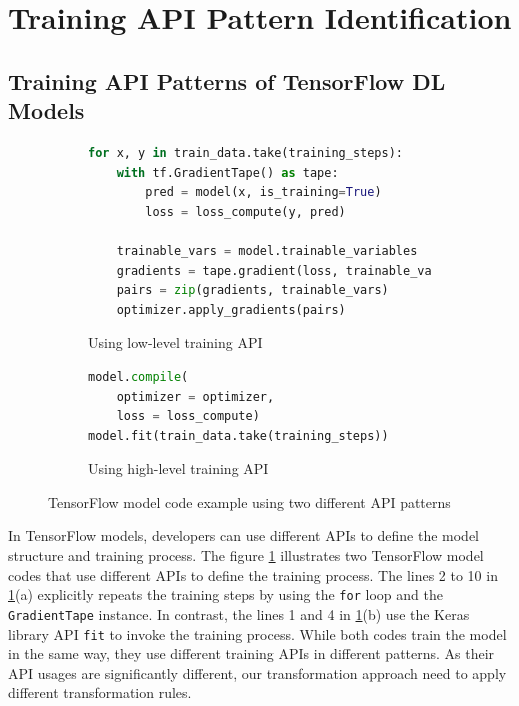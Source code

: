 \pagebreak
\section{Training API Pattern Identification}\label{sec:pattern}

\subsection{Training API Patterns of TensorFlow DL Models}

\begin{figure}[ht!]
\centering
  \begin{subfigure}[b]{\textwidth}
    \begin{lstlisting}[language=Python]
for x, y in train_data.take(training_steps):
    with tf.GradientTape() as tape:
        pred = model(x, is_training=True)
        loss = loss_compute(y, pred)

    trainable_vars = model.trainable_variables
    gradients = tape.gradient(loss, trainable_vars)
    pairs = zip(gradients, trainable_vars)
    optimizer.apply_gradients(pairs) 
    \end{lstlisting}
    \caption{Using low-level training API}
  \end{subfigure}
  \hspace{5mm}
  \begin{subfigure}[b]{\textwidth}
    \begin{lstlisting}[language=Python]
model.compile(
    optimizer = optimizer, 
    loss = loss_compute) 
model.fit(train_data.take(training_steps))
    \end{lstlisting} 
    \caption{Using high-level training API}
  \end{subfigure}

  \caption{TensorFlow model code example using two different API patterns}
  \label{fig:pattern:ex01}
\end{figure}

In TensorFlow models, developers can use different APIs to define the 
model structure and training process.
The figure \ref{fig:pattern:ex01} illustrates two TensorFlow model codes that
use different APIs to define the training process.
The lines 2 to 10 in \ref{fig:pattern:ex01}(a)  
explicitly repeats the training steps by using the {\tt for} loop
and the {\tt GradientTape} instance.
In contrast, the lines 1 and 4 in \ref{fig:pattern:ex01}(b)
use the Keras library API {\tt fit} to invoke the training process.
While both codes train the model in the same way, they use different training 
APIs in different patterns.
As their API usages are significantly different, our transformation approach
need to apply different transformation rules.

